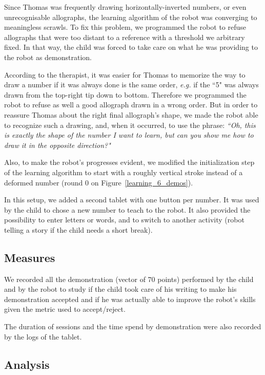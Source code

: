 \documentclass[conference]{IEEEtran}
\begin{document}
Since Thomas was frequently drawing horizontally-inverted numbers, or even
unrecognisable allographs, the learning algorithm of the robot was converging to
meaningless scrawls. To fix this problem, we programmed the robot to refuse allographs that
were too distant to a reference with a threshold we arbitrary fixed. In that way,
the child was forced to take care on what he was providing to the robot as
demonstration. 

According to the therapist, it was easier for Thomas to memorize the way to draw
a number if it was always done is the same order, \emph{e.g.} if the ``5" was always
drawn from the top-right tip down to bottom. Therefore we programmed the robot to
refuse as well a good allograph drawn in a wrong order. But in order to reassure Thomas
about the right final allograph's shape, we made the robot able to recognize
such a drawing, and, when it occurred, to use the phrase:
\emph{``Oh, this is exactly the shape of the number I want to learn, but can you
show me how to draw it in the opposite direction?"}

Also, to make
the robot's progresses evident, we modified the initialization step of the
learning algorithm to start with a roughly vertical stroke instead of a
deformed number (round 0 on Figure~\ref{learning_6_demos}).

In this setup, we added a second tablet with one button per number. It was used
by the child to chose a new number to teach to the robot. It also provided the
possibility to enter letters or words, and to switch to another activity (robot telling a story if the child needs a short break).

\subsection{Measures}

We recorded all the demonstration (vector of 70 points) performed by the child and by the robot to study if the child took care of his writing to make his demonstration accepted and if he was actually able to improve the robot's skills given the metric used to accept/reject. 

The duration of sessions and the time spend by demonstration were also recorded by the logs of the tablet. 


\subsection{Analysis}
\end{document}
